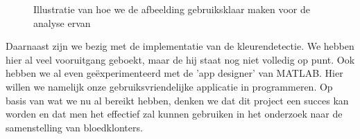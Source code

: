 \documentclass[a4paper,kulak]{kulakarticle}
\begin{document}
		\begin{figure}[H]
		\centering
		\qquad
		
		\caption{Illustratie van hoe we de afbeelding gebruiksklaar maken voor de analyse ervan}
		\label{fig: voorna}
		\end{figure}
		
		
		Daarnaast zijn we bezig met de implementatie van de kleurendetectie. We hebben hier al veel vooruitgang geboekt, maar de hij staat nog niet volledig op punt. Ook hebben we al even geëxperimenteerd met de 'app designer' van MATLAB. Hier willen we namelijk onze gebruiksvriendelijke applicatie in programmeren.
		Op basis van wat we nu al bereikt hebben, denken we dat dit project een succes kan worden en dat men het effectief zal kunnen gebruiken in het onderzoek naar de samenstelling van bloedklonters.
	
	\newpage
\end{document}
